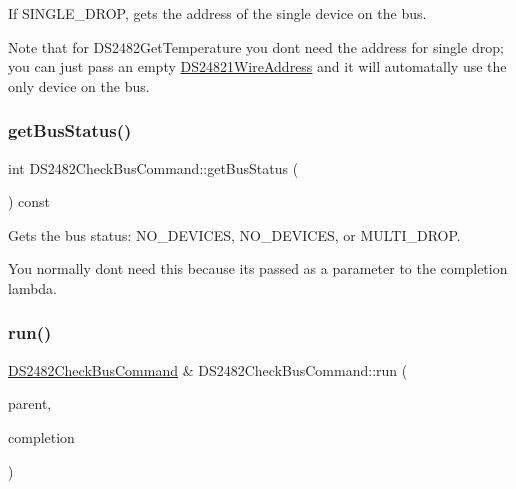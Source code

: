 If S\+I\+N\+G\+L\+E\+\_\+\+D\+R\+OP, gets the address of the single device on the bus. 

Note that for D\+S2482\+Get\+Temperature you don\textquotesingle{}t need the address for single drop; you can just pass an empty \mbox{\hyperlink{class_d_s24821_wire_address}{D\+S24821\+Wire\+Address}} and it will automatally use the only device on the bus. \mbox{\label{class_d_s2482_check_bus_command_a2d374709f24c8d7ad0c48766d7f072ee}} 
\subsubsection{\texorpdfstring{get\+Bus\+Status()}{getBusStatus()}}
{\footnotesize\ttfamily int D\+S2482\+Check\+Bus\+Command\+::get\+Bus\+Status (\begin{DoxyParamCaption}{ }\end{DoxyParamCaption}) const\hspace{0.3cm}{\ttfamily [inline]}}



Gets the bus status\+: N\+O\+\_\+\+D\+E\+V\+I\+C\+ES, N\+O\+\_\+\+D\+E\+V\+I\+C\+ES, or M\+U\+L\+T\+I\+\_\+\+D\+R\+OP. 

You normally don\textquotesingle{}t need this because it\textquotesingle{}s passed as a parameter to the completion lambda. \mbox{\label{class_d_s2482_check_bus_command_a6710655a1ac2abc35d08db156d215c75}} 
\subsubsection{\texorpdfstring{run()}{run()}}
{\footnotesize\ttfamily \mbox{\hyperlink{class_d_s2482_check_bus_command}{D\+S2482\+Check\+Bus\+Command}} \& D\+S2482\+Check\+Bus\+Command\+::run (\begin{DoxyParamCaption}\item[{\mbox{\hyperlink{class_d_s2482}{D\+S2482}} \&}]{parent,  }\item[{std\+::function$<$ void(\mbox{\hyperlink{class_d_s2482_check_bus_command}{D\+S2482\+Check\+Bus\+Command}} \&, int status, int bus\+Status)$>$}]{completion }\end{DoxyParamCaption})\hspace{0.3cm}{\ttfamily [static]}}



